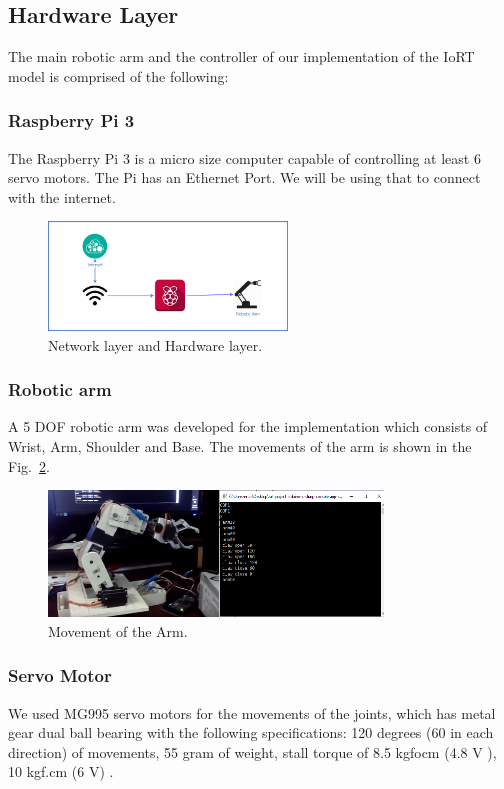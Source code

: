 \documentclass[conference]{IEEEtran}
\begin{document}
\subsection{Hardware Layer}
The main robotic arm and the controller of our implementation of the IoRT model is comprised of the following:

\subsubsection{Raspberry Pi 3}
The Raspberry Pi 3 is a micro size computer capable of controlling at least 6 servo motors. The Pi has an Ethernet Port. We will be using that to connect with the internet. \cite{fifteen,sixteen}

\begin{figure}[ht!] %
 \centering
 \includegraphics[width=2.5in]{d.png}
 \caption{Network layer and Hardware layer.}
 \label{NetworkHardwareLayer}
 \end{figure}


\subsubsection{Robotic arm}
A 5 DOF robotic arm was developed for the implementation which consists of Wrist, Arm, Shoulder and Base. The movements of the arm is shown in the Fig.~\ref{armMovement}.
\begin{figure}[ht!] %
 \centering
 \includegraphics[width=3.5in]{Picture3a.png}
 \caption{Movement of the Arm.}
 \label{armMovement}
 \end{figure}


\subsubsection{Servo Motor}
We used MG995 servo motors for the movements of the joints, which has metal gear dual ball bearing with the following specifications: 120 degrees (60 in each direction) of movements, 55 gram of weight, stall torque of 8.5 kgfocm (4.8 V ), 10 kgf.cm (6 V) \cite{seventeen}.
\end{document}
